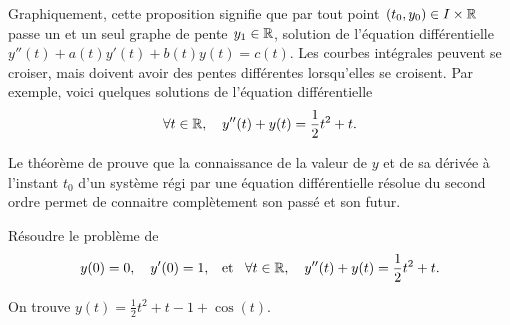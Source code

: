 \documentclass{magnoliaold}
\begin{document}
\begin{remarques}
\remarque Graphiquement, cette proposition signifie que par tout
  point $(t_0,y_0)\in I\times \mathbb{R}$ passe un et un seul graphe de pente $y_1\in\mathbb{R}$,
  solution de l'équation différentielle $y''(t)+a(t)y'(t)+b(t)y(t)=c(t)$. Les courbes intégrales peuvent se croiser, mais doivent avoir des pentes différentes lorsqu'elles se croisent. Par exemple, voici quelques
  solutions de l'équation différentielle
  \[\forall t\in\mathbb{R},\quad y''(t)+y(t)=\frac{1}{2}t^2+t.\]
\begin{center}
\end{center}
\remarque Le théorème de  prouve que la connaissance de la valeur de $y$ et de sa dérivée à l'instant $t_0$ d'un système régi par une équation différentielle résolue du second ordre permet de connaitre complètement son passé et son futur.
\end{remarques}
\vspace{2ex}
\begin{exoUnique}
\exo Résoudre le problème de 
  \[y(0)=0,\quad y'(0)=1,\quad\!\text{et}\quad\! \forall t\in\mathbb{R},\quad y''(t)+y(t)=\frac{1}{2}t^2+t.\]
\begin{sol}
On trouve $y(t)=\frac{1}{2}t^2+t-1+\cos(t)$.
\end{sol}
\end{exoUnique}
\end{document}
